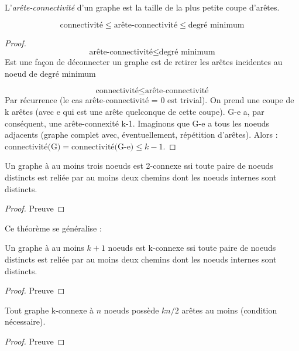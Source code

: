 \begin{mydef}
   L'\emph{arête-connectivité} d'un graphe est la taille de la plus petite coupe d'arêtes.
\end{mydef}

\begin{mytheo} 
  $$ \text{connectivité} \leq \text{arête-connectivité} \leq \text{degré minimum}$$
  \begin{proof}
    \noindent
    $$\text{arête-connectivité} \leq \text{degré minimum}$$
    Est une façon de déconnecter un graphe est de retirer les arêtes incidentes au noeud de degré minimum
    
    $$\text{connectivité} \leq \text{arête-connectivité}$$
    Par récurrence (le cas arête-connectivité = 0 est trivial). On prend une coupe de k arêtes (avec e qui est une arête quelconque de cette coupe). G-e a, par conséquent, une arête-connexité k-1. Imaginons que G-e a tous les noeuds adjacents (graphe complet avec, éventuellement, répétition d'arêtes). Alors : $\text{connectivité(G)}=\text{connectivité(G-e)} \leq k-1$.
 \end{proof}
\end{mytheo}

\begin{mytheo} 
  Un graphe à au moins trois noeuds est 2-connexe ssi toute paire de noeuds distincts est reliée par au moins deux chemins dont les noeuds internes sont distincts.
  \begin{proof}
     Preuve \addTODO
  \end{proof}
\end{mytheo}

Ce théorème se généralise :

\begin{mytheo} 
  Un graphe à au moins $k + 1$ noeuds est k-connexe ssi toute paire de noeuds distincts est reliée par au moins deux chemins dont les noeuds internes sont distincts.
  \begin{proof}
     Preuve \addTODO
  \end{proof}
\end{mytheo}

\begin{mytheo} 
  Tout graphe k-connexe à $n$ noeuds possède $kn/2$ arêtes au moins (condition nécessaire).
  \begin{proof}
     Preuve \addTODO
  \end{proof}
\end{mytheo}

